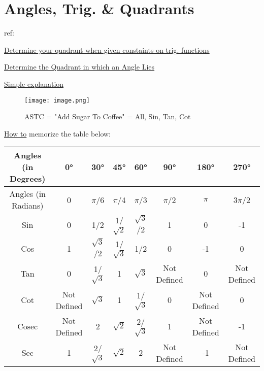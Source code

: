 \documentclass[openany]{book}
\begin{document}
\section{Angles, Trig. \& Quadrants}

ref:

\href{https://www.youtube.com/watch?v=1MoCe5QvHU4}{Determine your quadrant when given constaints on trig. functions}

\href{https://www.youtube.com/watch?v=FTk2fjvCkQM}{Determine the Quadrant in which an Angle Lies}

\href{https://www.youtube.com/watch?v=1MoCe5QvHU4}{Simple explanation}

\begin{figure}
	\texttt{[image: image.png]}
	\caption{ASTC = "Add Sugar To Coffee" = All, Sin, Tan, Cot}
	\label{fig:enter-label}
\end{figure}


\href{https://www.youtube.com/watch?v=qW6Ua50fTw8}{How to} memorize the table below:

\begin{table}[!ht]
	\centering
	\begin{tabular}{|c|c|c|c|c|c|c|c|}
		\hline
		Angles (in Degrees) & 0°          & 30°        & 45°        & 60°        & 90°         & 180°        & 270°        \\ \hline
		Angles (in Radians) & 0           & $\pi$/6    & $\pi$/4    & $\pi$/3    & $\pi$/2     & $\pi$       & 3$\pi$/2    \\ \hline
		Sin                 & 0           & 1/2        & 1/$\sqrt2$ & $\sqrt3$/2 & 1           & 0           & -1          \\ \hline
		Cos                 & 1           & $\sqrt3$/2 & 1/$\sqrt3$ & 1/2        & 0           & -1          & 0           \\ \hline
		Tan                 & 0           & 1/$\sqrt3$ & 1          & $\sqrt3$   & Not Defined & 0           & Not Defined \\ \hline
		Cot                 & Not Defined & $\sqrt3$   & 1          & 1/$\sqrt3$ & 0           & Not Defined & 0           \\ \hline
		Cosec               & Not Defined & 2          & $\sqrt2$   & 2/$\sqrt3$ & 1           & Not Defined & -1          \\ \hline
		Sec                 & 1           & 2/$\sqrt3$ & $\sqrt2$   & 2          & Not Defined & -1          & Not Defined \\ \hline
	\end{tabular}
\end{table}
\end{document}
